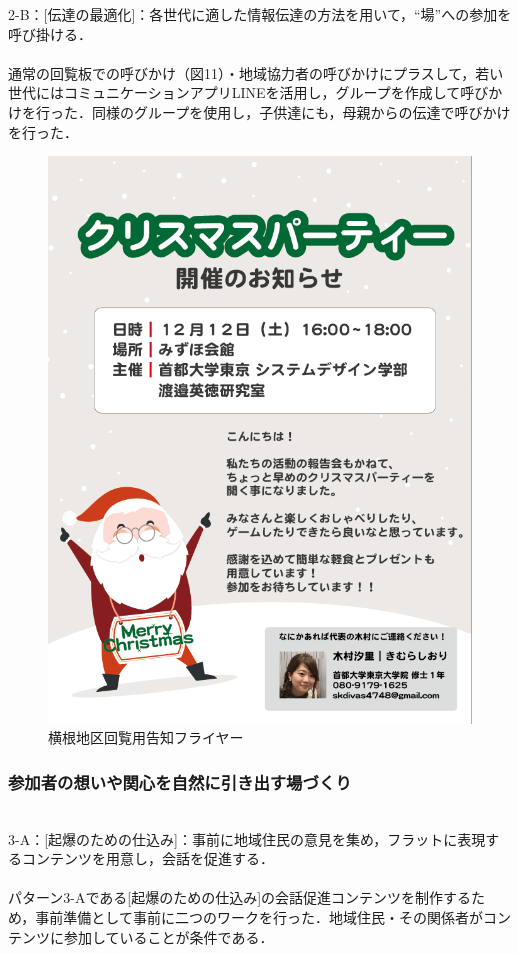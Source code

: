 \documentclass[a4paper]{jsarticle}
\begin{document}
2-B：[伝達の最適化]：各世代に適した情報伝達の方法を用いて，“場”への参加を呼び掛ける．\\\\
通常の回覧板での呼びかけ（図11）・地域協力者の呼びかけにプラスして，若い世代にはコミュニケーションアプリLINEを活用し，グループを作成して呼びかけを行った．同様のグループを使用し，子供達にも，母親からの伝達で呼びかけを行った．
\begin{figure}[H]
  \begin{center}
    \includegraphics[width=0.8\hsize]{./images/05.png}
    \caption{横根地区回覧用告知フライヤー}
    \label{chirstmas2}
  \end{center}
\end{figure}

\subsubsection{参加者の想いや関心を自然に引き出す場づくり}\\
3-A：[起爆のための仕込み]：事前に地域住民の意見を集め，フラットに表現するコンテンツを用意し，会話を促進する．\\\\
パターン3-Aである[起爆のための仕込み]の会話促進コンテンツを制作するため，事前準備として事前に二つのワークを行った．地域住民・その関係者がコンテンツに参加していることが条件である．\\\\
\end{document}

